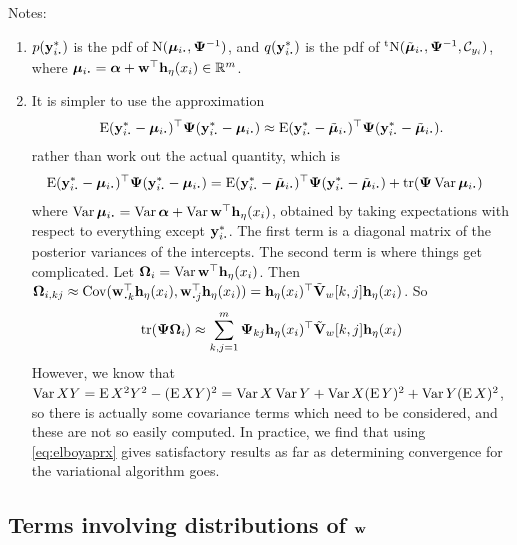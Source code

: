 Notes:
\begin{enumerate}
  \item $p(\by_{i \bigcdot}^*)$ is the pdf of $\N(\bmu_{i \bigcdot}, \bPsi^{-1})$, and $q(\by_{i \bigcdot}^*)$ is the pdf of $\tN(\tilde\bmu_{i \bigcdot}, \bPsi^{-1}, \cC_{y_i})$, where $\bmu_{i \bigcdot} = \balpha + \bw^\top\bh_\eta(x_i) \in \bbR^m$.
  \item It is simpler to use the approximation
  \begin{align}\label{eq:elboyaprx}
    \E (\by^*_{i \bigcdot} - \bmu_{i \bigcdot})^\top \bPsi (\by^*_{i \bigcdot} - \bmu_{i \bigcdot})
    \approx \E (\by^*_{i \bigcdot} - \tilde\bmu_{i \bigcdot})^\top \bPsi (\by^*_{i \bigcdot} - \tilde\bmu_{i \bigcdot}).   
  \end{align}
  rather than work out the actual quantity, which is
  \begin{align}\label{eq:elboyact}
    \E (\by^*_{i \bigcdot} - \bmu_{i \bigcdot})^\top \bPsi (\by^*_{i \bigcdot} - \bmu_{i \bigcdot})
    &= \E (\by^*_{i \bigcdot} - \tilde\bmu_{i \bigcdot})^\top \bPsi (\by^*_{i \bigcdot} - \tilde\bmu_{i \bigcdot}) + \tr(\bPsi\Var \bmu_{i \bigcdot})
  \end{align}
  where $\Var \bmu_{i \bigcdot} = \Var \balpha + \Var \bw^\top\bh_\eta(x_i)$, obtained by taking expectations with respect to everything except $\by^*_{i \bigcdot}$.
  The first term is a diagonal matrix of the posterior variances of the intercepts.
  The second term is where things get complicated.
  Let ${\bm\Omega}_i = \operatorname{Var} {\mathbf w}^\top{\mathbf h}_\eta(x_i)$. 
  Then $\bOmega_{i,kj} \approx \Cov(\bw^\top_{\bigcdot k}\bh_\eta(x_i), \bw^\top_{\bigcdot j}\bh_\eta(x_i)) = \bh_\eta(x_i)^\top \tilde\bV_w[k,j]\bh_\eta(x_i)$. 
  So
  \[
    \operatorname{tr}({\bm\Psi} {\bm\Omega}_i) \approx \sum_{k,j=1}^m {\bm\Psi}_{kj} {\mathbf h}_\eta(x_i)^\top \tilde{{\mathbf V}}_w[k,j]{\mathbf h}_\eta(x_i)
  \]
  However, we know that $\operatorname{Var} XY = \operatorname{E} X^2Y^2 - (\operatorname{E} XY)^2 = \operatorname{Var} X \operatorname{Var} Y + \operatorname{Var} X (\operatorname{E} Y)^2 + \operatorname{Var} Y (\operatorname{E} X)^2$, so there is actually some covariance terms which need to be considered, and these are not so easily computed.
  In practice, we find that using \cref{eq:elboyaprx} gives satisfactory results as far as determining convergence for the variational algorithm goes. 
\end{enumerate}

\subsection{Terms involving distributions of ${\mathbf w}$}

